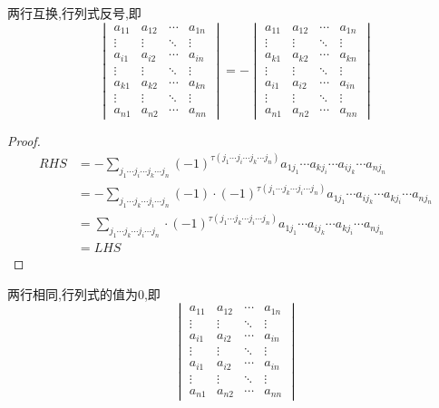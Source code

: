 \documentclass{ctexart}
\begin{document}
\begin{theorem}
    两行互换,行列式反号,即
    \[\begin{vmatrix}
        a_{11}&a_{12}&\cdots&a_{1n}\\
        \vdots&\vdots&\ddots&\vdots\\
        a_{i1}&a_{i2}&\cdots&a_{in}\\
        \vdots&\vdots&\ddots&\vdots\\
        a_{k1}&a_{k2}&\cdots&a_{kn}\\
        \vdots&\vdots&\ddots&\vdots\\
        a_{n1}&a_{n2}&\cdots&a_{nn}
    \end{vmatrix}=-
    \begin{vmatrix}
        a_{11}&a_{12}&\cdots&a_{1n}\\
        \vdots&\vdots&\ddots&\vdots\\
        a_{k1}&a_{k2}&\cdots&a_{kn}\\
        \vdots&\vdots&\ddots&\vdots\\
        a_{i1}&a_{i2}&\cdots&a_{in}\\
        \vdots&\vdots&\ddots&\vdots\\
        a_{n1}&a_{n2}&\cdots&a_{nn}
    \end{vmatrix}\]
\end{theorem}
\begin{proof}
    \[\begin{aligned}
        RHS
        &= -\sum_{j_1\cdots j_i\cdots j_k\cdots j_n}(-1)^{\tau\left(j_1\cdots j_i\cdots j_k\cdots j_n\right)}a_{1j_1}\cdots a_{kj_i}\cdots a_{ij_k}\cdots a_{nj_n} \\
        &= -\sum_{j_1\cdots j_k\cdots j_i\cdots j_n}(-1)\cdot(-1)^{\tau\left(j_1\cdots j_k\cdots j_i\cdots j_n\right)}a_{1j_1}\cdots a_{ij_k}\cdots a_{kj_i}\cdots a_{nj_n} \\
        &= \sum_{j_1\cdots j_k\cdots j_i\cdots j_n}\cdot(-1)^{\tau\left(j_1\cdots j_k\cdots j_i\cdots j_n\right)}a_{1j_1}\cdots a_{ij_k}\cdots a_{kj_i}\cdots a_{nj_n} \\
        &= LHS
    \end{aligned}\]
\end{proof}
\begin{theorem}
    两行相同,行列式的值为$0$,即
    \[\begin{vmatrix}
        a_{11}&a_{12}&\cdots&a_{1n}\\
        \vdots&\vdots&\ddots&\vdots\\
        a_{i1}&a_{i2}&\cdots&a_{in}\\
        \vdots&\vdots&\ddots&\vdots\\
        a_{i1}&a_{i2}&\cdots&a_{in}\\
        \vdots&\vdots&\ddots&\vdots\\
        a_{n1}&a_{n2}&\cdots&a_{nn}
    \end{vmatrix}\]
\end{theorem}
\end{document}
